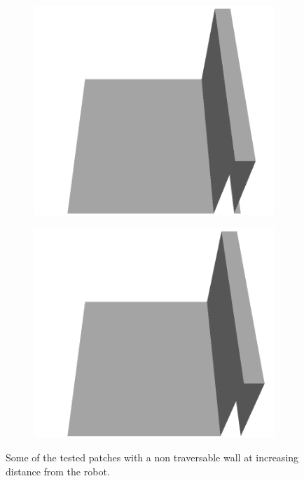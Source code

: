 \documentclass[../document.tex]{subfiles}
\begin{document}
\begin{figure} [htbp]
\begin{subfigure}[b]{0.24\textwidth}
    \includegraphics[width=\linewidth]{../img/5/custom_patches/walls_front/all/21-3d.png}
    \end{subfigure}
    \begin{subfigure}[b]{0.24\textwidth}
    \includegraphics[width=\linewidth]{../img/5/custom_patches/walls_front/all/24-3d.png}
    \end{subfigure}
    \caption{Some of the tested patches with a non traversable wall at increasing distance from the robot.}
\label{fig: wall-distance}
    \end{figure}
\end{document}
